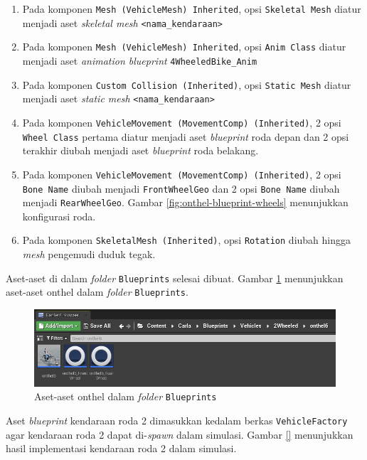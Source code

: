 \begin{enumerate}
    \item Pada komponen \verb|Mesh (VehicleMesh) Inherited|, opsi \verb|Skeletal Mesh|
    diatur menjadi aset \textit{skeletal mesh} \verb|<nama_kendaraan>|
    \item Pada komponen \verb|Mesh (VehicleMesh) Inherited|, opsi \verb|Anim Class|
    diatur menjadi aset \textit{animation blueprint} \verb|4WheeledBike_Anim|
    \item Pada komponen \verb|Custom Collision (Inherited)|, opsi \verb|Static Mesh|
    diatur menjadi aset \textit{static mesh} \verb|<nama_kendaraan>|
    \item Pada komponen \verb|VehicleMovement (MovementComp) (Inherited)|, 2
    opsi \verb|Wheel Class| pertama diatur menjadi aset \textit{blueprint} roda
    depan dan 2 opsi terakhir diubah menjadi aset \textit{blueprint} roda
    belakang.
    \item Pada komponen \verb|VehicleMovement (MovementComp) (Inherited)|, 2
    opsi \verb|Bone Name| diubah menjadi \verb|FrontWheelGeo| dan 2 opsi
    \verb|Bone Name| diubah menjadi \verb|RearWheelGeo|. Gambar
    \ref{fig:onthel-blueprint-wheels} menunjukkan konfigurasi roda.
    \item Pada komponen \verb|SkeletalMesh (Inherited)|, opsi \verb|Rotation|
    diubah hingga \textit{mesh} pengemudi duduk tegak.
\end{enumerate}

Aset-aset di dalam \textit{folder} \verb|Blueprints| selesai dibuat. Gambar
\ref{fig:onthel-assets-in-blueprints-folder} menunjukkan aset-aset onthel dalam
\textit{folder} \verb|Blueprints|.

\begin{figure}[!h]
    \centering
    \includegraphics[width=1\textwidth]{resources/chapter-4/onthel-assets-in-blueprints-folder.png}
    \caption{Aset-aset onthel dalam \textit{folder} \texttt{Blueprints}}
    \label{fig:onthel-assets-in-blueprints-folder}
\end{figure}

Aset \textit{blueprint} kendaraan roda 2 dimasukkan kedalam berkas
\verb|VehicleFactory| agar kendaraan roda 2 dapat di-\textit{spawn} dalam
simulasi. Gambar \ref{} menunjukkan hasil implementasi kendaraan roda 2 dalam
simulasi.

